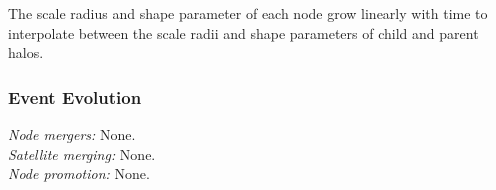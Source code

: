 The scale radius and shape parameter of each node grow linearly with time to interpolate between the scale radii and shape parameters of child and parent halos.

\subsubsection{Event Evolution}

\noindent\emph{Node mergers:} None.\\

\noindent\emph{Satellite merging:} None.\\

\noindent\emph{Node promotion:} None.\\
